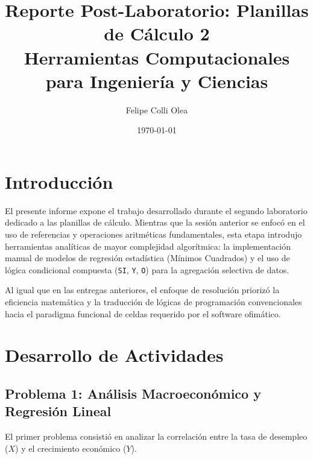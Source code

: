 \documentclass[11pt]{article}
\title{Reporte Post-Laboratorio: Planillas de Cálculo 2 \\ \large{Herramientas Computacionales para Ingeniería y Ciencias}}
\author{Felipe Colli Olea}
\date{\today}
\begin{document}
\maketitle
\thispagestyle{fancy}

\section{Introducción}

El presente informe expone el trabajo desarrollado durante el segundo laboratorio dedicado a las planillas de cálculo. Mientras que la sesión anterior se enfocó en el uso de referencias y operaciones aritméticas fundamentales, esta etapa introdujo herramientas analíticas de mayor complejidad algorítmica: la implementación manual de modelos de regresión estadística (Mínimos Cuadrados) y el uso de lógica condicional compuesta (\texttt{SI}, \texttt{Y}, \texttt{O}) para la agregación selectiva de datos.

Al igual que en las entregas anteriores, el enfoque de resolución priorizó la eficiencia matemática y la traducción de lógicas de programación convencionales hacia el paradigma funcional de celdas requerido por el software ofimático.

\section{Desarrollo de Actividades}

\subsection{Problema 1: Análisis Macroeconómico y Regresión Lineal}
El primer problema consistió en analizar la correlación entre la tasa de desempleo ($X$) y el crecimiento económico ($Y$).
\end{document}

